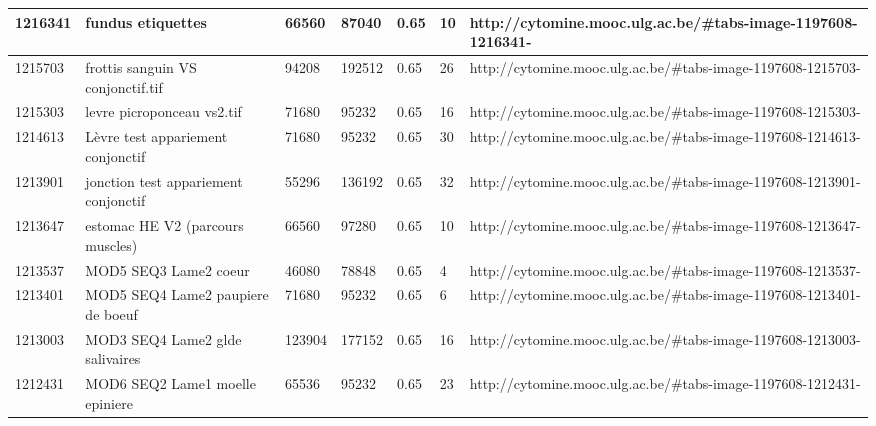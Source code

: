 \documentclass[a4paper,11pt]{report}
\numberwithin{figure}{chapter} %
\begin{document}
\begin{table}[]
{\begin{tabular}{|l|l|l|l|l|l|l|}
1216341  & fundus etiquettes                                                                            & 66560  & 87040  & 0.65                  & 10          & http://cytomine.mooc.ulg.ac.be/\#tabs-image-1197608-1216341-  \\ \hline
1215703  & frottis sanguin VS conjonctif.tif                                                            & 94208  & 192512 & 0.65                  & 26          & http://cytomine.mooc.ulg.ac.be/\#tabs-image-1197608-1215703-  \\ \hline
1215303  & levre picroponceau vs2.tif                                                                   & 71680  & 95232  & 0.65                  & 16          & http://cytomine.mooc.ulg.ac.be/\#tabs-image-1197608-1215303-  \\ \hline
1214613  & L\`{e}vre test appariement  conjonctif                                                           & 71680  & 95232  & 0.65                  & 30          & http://cytomine.mooc.ulg.ac.be/\#tabs-image-1197608-1214613-  \\ \hline
1213901  & jonction test appariement conjonctif                                                         & 55296  & 136192 & 0.65                  & 32          & http://cytomine.mooc.ulg.ac.be/\#tabs-image-1197608-1213901-  \\ \hline
1213647  & estomac HE V2 (parcours muscles)                                                             & 66560  & 97280  & 0.65                  & 10          & http://cytomine.mooc.ulg.ac.be/\#tabs-image-1197608-1213647-  \\ \hline
1213537  & MOD5 SEQ3 Lame2 coeur                                                                        & 46080  & 78848  & 0.65                  & 4           & http://cytomine.mooc.ulg.ac.be/\#tabs-image-1197608-1213537-  \\ \hline
1213401  & MOD5 SEQ4 Lame2 paupiere de boeuf                                                            & 71680  & 95232  & 0.65                  & 6           & http://cytomine.mooc.ulg.ac.be/\#tabs-image-1197608-1213401-  \\ \hline
1213003  & MOD3 SEQ4 Lame2 glde salivaires                                                              & 123904 & 177152 & 0.65                  & 16          & http://cytomine.mooc.ulg.ac.be/\#tabs-image-1197608-1213003-  \\ \hline
1212431  & MOD6 SEQ2 Lame1 moelle epiniere                                                              & 65536  & 95232  & 0.65                  & 23          & http://cytomine.mooc.ulg.ac.be/\#tabs-image-1197608-1212431-  \\ \hline

\end{tabular}}
\end{table}
\end{document}
